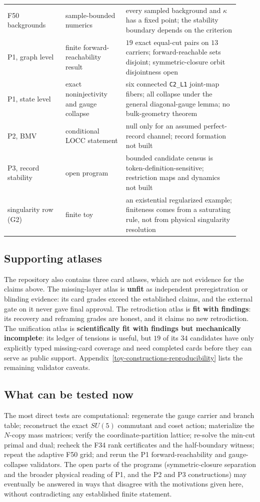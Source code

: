 \documentclass[11pt]{article}
\theoremstyle{definition}
\begin{document}
\begin{longtable}[]{@{}p{0.23\linewidth}p{0.24\linewidth}p{0.45\linewidth}@{}}
F50 backgrounds & sample-bounded numerics & every sampled background and \(\kappa\) has a fixed point; the stability
boundary depends on the criterion\\
P1, graph level & finite forward-reachability result & \(19\) exact equal-cut pairs on \(13\) carriers; forward-reachable
sets disjoint; symmetric-closure orbit disjointness open\\
P1, state level & exact noninjectivity and gauge collapse & six connected \texttt{C2\_L1} joint-map fibers; all collapse
under the general diagonal-gauge lemma; no bulk-geometry theorem\\
P2, BMV & conditional LOCC statement & null only for an assumed perfect-record channel; record formation not built\\
P3, record stability & open program & bounded candidate census is token-definition-sensitive; restriction maps and
dynamics not built\\
singularity row (G2) & finite toy & an existential regularized example; finiteness comes from a saturating rule, not from
physical singularity resolution\\
\bottomrule
\end{longtable}

\subsection{Supporting atlases}

The repository also contains three card atlases, which are not evidence for the claims above. The missing-layer
atlas is \textbf{unfit} as independent preregistration or blinding evidence: its card grades exceed the established
claims, and the external gate on it never gave final approval. The retrodiction atlas is \textbf{fit with findings}:
its recovery and reframing grades are honest, and it claims no new retrodiction. The unification atlas is
\textbf{scientifically fit with findings but mechanically incomplete}: its ledger of tensions is useful, but \(19\) of
its \(34\) candidates have only explicitly typed missing-card coverage and need completed cards before they can serve
as public support. Appendix~\ref{toy-constructions-reproducibility} lists the remaining validator caveats.

\subsection{What can be tested now}

The most direct tests are computational: regenerate the gauge carrier and branch table; reconstruct the exact
\(SU(5)\) commutant and coset action; materialize the \(N\)-copy mass matrices; verify the coordinate-partition
lattice; re-solve the min-cut primal and dual; recheck the F34 rank certificates and the half-boundary witness; repeat
the adaptive F50 grid; and rerun the P1 forward-reachability and gauge-collapse validators. The open parts of the
programs (symmetric-closure separation and the broader physical reading of P1, and the P2 and P3 constructions) may
eventually be answered in ways that disagree with the motivations given here, without contradicting any established
finite statement.
\end{document}
